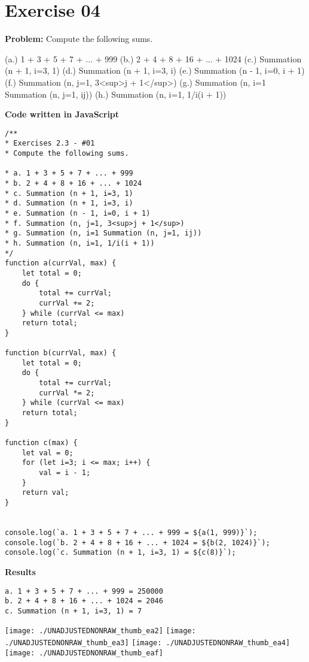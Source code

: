 \documentclass[paper=a4, fontsize=11pt]{scrartcl} %
\numberwithin{equation}{section}
\numberwithin{figure}{section}
\numberwithin{table}{section}
\begin{document}
\pagebreak


\section{Exercise 04}

\textbf{Problem:} Compute the following sums.

(a.) 1 + 3 + 5 + 7 + ... + 999
(b.) 2 + 4 + 8 + 16 + ... + 1024
(c.) Summation (n + 1, i=3, 1)
(d.) Summation (n + 1, i=3, i)
(e.) Summation (n - 1, i=0, i + 1)
(f.) Summation (n, j=1, 3<sup>j + 1</sup>)
(g.) Summation (n, i=1 Summation (n, j=1, ij))
(h.) Summation (n, i=1, 1/i(i + 1))

\bigskip
\textbf{Code written in JavaScript}
\begin{lstlisting}
/**
* Exercises 2.3 - #01
* Compute the following sums.

* a. 1 + 3 + 5 + 7 + ... + 999
* b. 2 + 4 + 8 + 16 + ... + 1024
* c. Summation (n + 1, i=3, 1)
* d. Summation (n + 1, i=3, i)
* e. Summation (n - 1, i=0, i + 1)
* f. Summation (n, j=1, 3<sup>j + 1</sup>)
* g. Summation (n, i=1 Summation (n, j=1, ij))
* h. Summation (n, i=1, 1/i(i + 1))
*/
function a(currVal, max) {
    let total = 0;
    do {
        total += currVal;
        currVal += 2;
    } while (currVal <= max)
    return total;
}

function b(currVal, max) {
    let total = 0;
    do {
        total += currVal;
        currVal *= 2;
    } while (currVal <= max)
    return total;
}

function c(max) {
    let val = 0;
    for (let i=3; i <= max; i++) {
        val = i - 1;
    }
    return val;
}


console.log(`a. 1 + 3 + 5 + 7 + ... + 999 = ${a(1, 999)}`);
console.log(`b. 2 + 4 + 8 + 16 + ... + 1024 = ${b(2, 1024)}`);
console.log(`c. Summation (n + 1, i=3, 1) = ${c(8)}`);

\end{lstlisting}

\bigskip
\textbf{Results}
\begin{lstlisting}
a. 1 + 3 + 5 + 7 + ... + 999 = 250000
b. 2 + 4 + 8 + 16 + ... + 1024 = 2046
c. Summation (n + 1, i=3, 1) = 7
\end{lstlisting}

\texttt{[image: ./UNADJUSTEDNONRAW\_thumb\_ea2]}
\texttt{[image: ./UNADJUSTEDNONRAW\_thumb\_ea3]}
\texttt{[image: ./UNADJUSTEDNONRAW\_thumb\_ea4]}
\texttt{[image: ./UNADJUSTEDNONRAW\_thumb\_eaf]}
\end{document}
